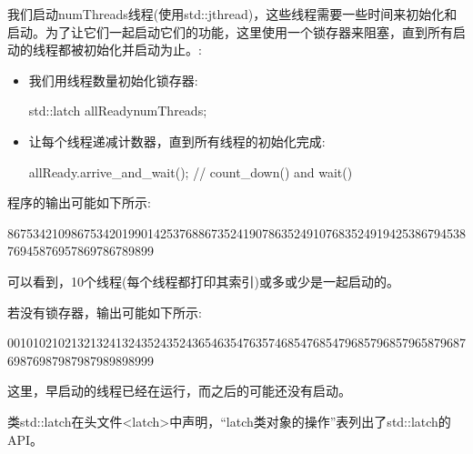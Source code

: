 我们启动numThreads线程(使用std::jthread)，这些线程需要一些时间来初始化和启动。为了让它们一起启动它们的功能，这里使用一个锁存器来阻塞，直到所有启动的线程都被初始化并启动为止。:

\begin{itemize}
\item 
我们用线程数量初始化锁存器:

\begin{cpp}
std::latch allReady{numThreads};
\end{cpp}

\item
让每个线程递减计数器，直到所有线程的初始化完成:

\begin{cpp}
allReady.arrive_and_wait(); // count_down() and wait()
\end{cpp}

\end{itemize}

程序的输出可能如下所示:

\begin{shell}
86753421098675342019901425376886735241907863524910768352491942538679453876945876957869786789899
\end{shell}

可以看到，10个线程(每个线程都打印其索引)或多或少是一起启动的。

若没有锁存器，输出可能如下所示:

\begin{shell}
00101021021321324132435243524365463547635746854768547968579685796587968769876987987987989898999
\end{shell}

这里，早启动的线程已经在运行，而之后的可能还没有启动。


类std::latch在头文件<latch>中声明，“latch类对象的操作”表列出了std::latch的API。

